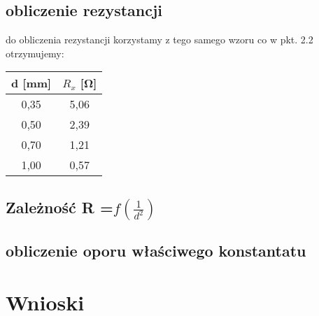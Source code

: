 \documentclass{article}
\begin{document}
\subsection{obliczenie rezystancji}
do obliczenia rezystancji korzystamy z tego samego wzoru co w pkt. 2.2\\
otrzymujemy: \\

\begin{center}
\begin{tabular}{ c | c }
d [mm] & $R_x$ [\si{\ohm}]\\
\hline
0,35 & 5,06\\ 
 0,50 & 2,39\\ 
 0,70 & 1,21\\ 
 1,00 & 0,57\\ 
 
\end{tabular}
\end{center}

\subsection {Zależność R =$ f(\frac{1}{d^2})$}

\subsection {obliczenie oporu właściwego konstantatu}

\section{Wnioski}
	
\end{document}
